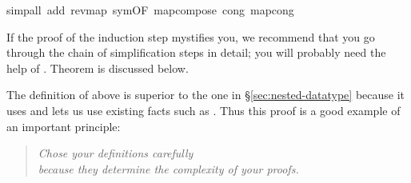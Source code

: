 \begin{isabellebody}
\begin{isamarkuptxt}
\end{isamarkuptxt}%
\isamarkuptrue%
\isamarkupfalse%
{\isacharparenleft}simp{\isacharunderscore}all\ add{\isacharcolon}\ rev{\isacharunderscore}map\ sym{\isacharbrackleft}OF\ map{\isacharunderscore}compose{\isacharbrackright}\ cong{\isacharcolon}\ map{\isacharunderscore}cong{\isacharparenright}%
\endisatagproof
{\isafoldproof}%
%
\isadelimproof
%
\endisadelimproof
%
\begin{isamarkuptext}%
\noindent
If the proof of the induction step mystifies you, we recommend that you go through
the chain of simplification steps in detail; you will probably need the help of
. Theorem  is discussed below.

The definition of  above is superior to the one in
\S\ref{sec:nested-datatype} because it uses 
and lets us use existing facts such as \hbox{}.
Thus this proof is a good example of an important principle:
\begin{quote}
\emph{Chose your definitions carefully\\
because they determine the complexity of your proofs.}
\end{quote}


\end{isamarkuptext}
\end{isabellebody}
